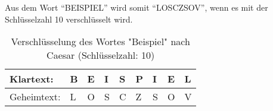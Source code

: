 \begin{table}[]
\centering
\caption{Die Chiffrierung nach Caesar aus dem Anwendungsbeispiel}
\label{tab:chiffrierung-caesar-anwendungsbeispiel}
\end{table}

Aus dem Wort \enquote{BEISPIEL} wird somit \enquote{LOSCZSOV}, wenn es mit der Schlüsselzahl 10 verschlüsselt wird.

\begin{table}[]
\centering
\caption{Verschlüsselung des Wortes "Beispiel" nach Caesar (Schlüsselzahl: 10)}
\label{tab:verschluesselung-caesar-beispiel-10}
\begin{tabular}{|l|llllllll|}
\hline
Klartext:   & B & E & I & S & P & I & E & L \\ \hline
Geheimtext: & L & O & S & C & Z & S & O & V \\ \hline
\end{tabular}%
\end{table}

